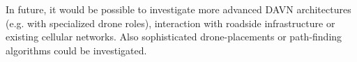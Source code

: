 \documentclass[]{nsm-thesis}
\begin{document}
In future, it would be possible to investigate more advanced \ac{DAVN} architectures (e.g. with specialized drone roles), interaction with roadside infrastructure or existing cellular networks. Also sophisticated drone-placements or path-finding algorithms could be investigated.

\cleardoublepage

\listofabbreviations
\clearpage

\listoffigures
\clearpage

\listoftables
\clearpage

\printbibliography
\end{document}
